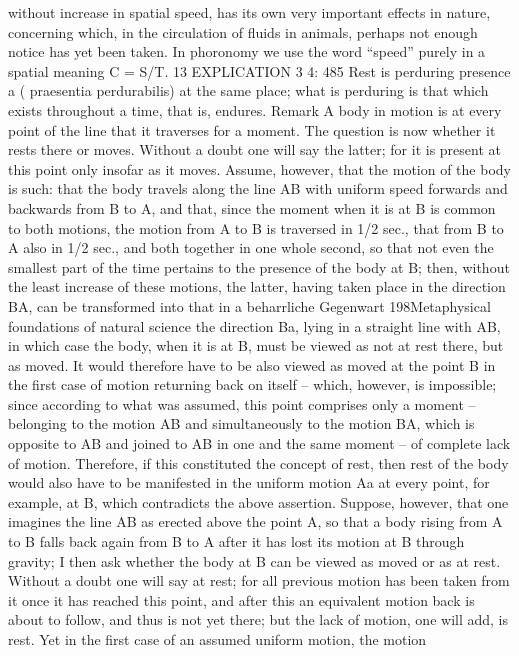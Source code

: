 without increase in spatial speed, has its own very important effects in
nature, concerning which, in the circulation of ﬂuids in animals, perhaps
not enough notice has yet been taken. In phoronomy we use the word
“speed” purely in a spatial meaning C = S/T. 13
EXPLICATION 3
4: 485
Rest is perduring presence a ( praesentia perdurabilis) at the same place;
what is perduring is that which exists throughout a time, that is, endures.
Remark
A body in motion is at every point of the line that it traverses for a
moment. The question is now whether it rests there or moves. Without
a doubt one will say the latter; for it is present at this point only insofar
as it moves. Assume, however, that the motion of the body is such:
that the body travels along the line AB with uniform speed forwards and
backwards from B to A, and that, since the moment when it is at B is
common to both motions, the motion from A to B is traversed in 1/2 sec.,
that from B to A also in 1/2 sec., and both together in one whole second,
so that not even the smallest part of the time pertains to the presence of
the body at B; then, without the least increase of these motions, the latter,
having taken place in the direction BA, can be transformed into that in
a
beharrliche Gegenwart
198Metaphysical foundations of natural science
the direction Ba, lying in a straight line with AB, in which case the body,
when it is at B, must be viewed as not at rest there, but as moved. It would
therefore have to be also viewed as moved at the point B in the ﬁrst case
of motion returning back on itself – which, however, is impossible; since
according to what was assumed, this point comprises only a moment –
belonging to the motion AB and simultaneously to the motion BA, which
is opposite to AB and joined to AB in one and the same moment – of
complete lack of motion. Therefore, if this constituted the concept of
rest, then rest of the body would also have to be manifested in the uniform
motion Aa at every point, for example, at B, which contradicts the above
assertion. Suppose, however, that one imagines the line AB as erected
above the point A, so that a body rising from A to B falls back again from
B to A after it has lost its motion at B through gravity; I then ask whether
the body at B can be viewed as moved or as at rest. Without a doubt one
will say at rest; for all previous motion has been taken from it once it has
reached this point, and after this an equivalent motion back is about to
follow, and thus is not yet there; but the lack of motion, one will add,
is rest. Yet in the ﬁrst case of an assumed uniform motion, the motion
